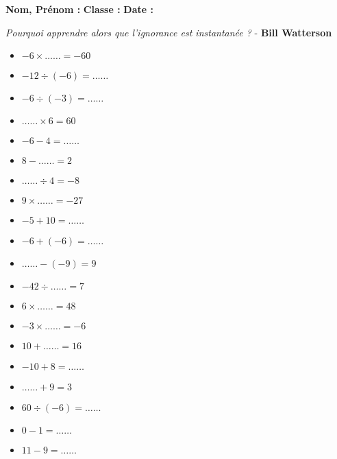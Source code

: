   \vspace{1cm}

  \textbf{Nom, Prénom :} \hspace{8cm} \textbf{Classe :} \hspace{3cm} \textbf{Date :}\\

  \vspace{-0.5cm} \begin{center}
    \textit{Pourquoi apprendre alors que l’ignorance est instantanée ?}  - \textbf{ Bill Watterson}
  \end{center}  \vspace{-0.5cm} 


\begin{multicols}{3}\noindent
    \begin{itemize}[label={$\bullet$}]
        \item $-6 \times \ldots\ldots = -60$
        \item $-12 \div \left( -6\right) = \ldots\ldots$
        \item $-6 \div \left( -3\right) = \ldots\ldots$
        \item $\ldots\ldots \times 6 = 60$
        \item $-6 - 4 = \ldots\ldots$
        \item $8 - \ldots\ldots = 2$
        \item $\ldots\ldots \div 4 = -8$
        \item $9 \times \ldots\ldots = -27$
        \item $-5 + 10 = \ldots\ldots$
        \item $-6 + \left( -6\right) = \ldots\ldots$
        \item $\ldots\ldots - \left( -9\right) = 9$
        \item $-42 \div \ldots\ldots = 7$
        \item $6 \times \ldots\ldots = 48$
        \item $-3 \times \ldots\ldots = -6$
        \item $10 + \ldots\ldots = 16$
        \item $-10 + 8 = \ldots\ldots$
        \item $\ldots\ldots + 9 = 3$
        \item $60 \div \left( -6\right) = \ldots\ldots$
        \item $0 - 1 = \ldots\ldots$
        \item $11 - 9 = \ldots\ldots$
    \end{itemize}
  \end{multicols}

